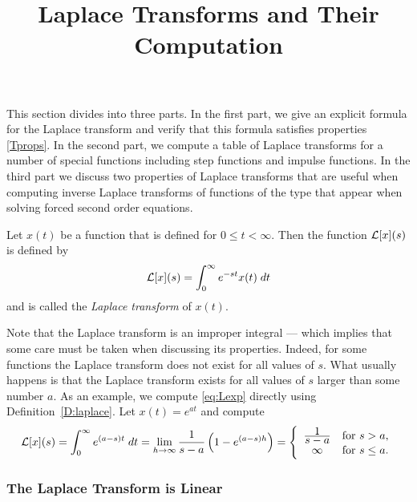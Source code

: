 \documentclass{ximera}
\title{Laplace Transforms and Their Computation}
\begin{document}
\begin{abstract}
\end{abstract}
\maketitle

 \label{S:13.3}

This section divides into three parts.  In the first part, we give an explicit 
formula for the Laplace transform and verify that this formula satisfies 
properties \eqref{Tprops}.  In the second part, we compute a table of Laplace
transforms for a number of special functions including step functions and
impulse functions.  In the third part we discuss two properties of Laplace
transforms that are useful when computing inverse Laplace transforms of
functions of the type that appear when solving forced second order equations.

\begin{definition}  \label{D:laplace}
Let $x(t)$ be a function that is defined for $0\le t < \infty$.
Then the function ${\cal L}[x](s)$ is defined by
\begin{equation} \label{E:laplace}
{\cal L}[x](s) = \int_0^{\infty} e^{-st} x(t)\; dt
\end{equation}
and is called the {\em Laplace transform\/} of $x(t)$.
\end{definition}

Note that the Laplace transform is an improper 
integral --- which implies that some care must be taken when discussing 
its properties.  Indeed, for some functions the Laplace transform does 
not exist for all values of $s$.  What usually happens is that 
the Laplace transform exists for all values of $s$ larger than some 
number $a$.  As an example, we compute \eqref{eq:Lexp} directly using 
Definition~\ref{D:laplace}.  Let $x(t)=e^{at}$ and compute 
\begin{equation}  \label{e:expat}
{\cal L}[x](s) = \int_0^{\infty} e^{(a-s)t}\; dt=
\lim\limits_{h\to \infty} \frac{1}{s-a}\left( 1-e^{(a-s)h} \right)
=\left\{ \begin{array}{cl} \frac{\displaystyle 1}{\displaystyle s-a} & \mbox{for $s>a$,}\\
\infty & \mbox{for $s\le a$.}\end{array}\right.
\end{equation}

\subsubsection*{The Laplace Transform is Linear}
\end{document}
